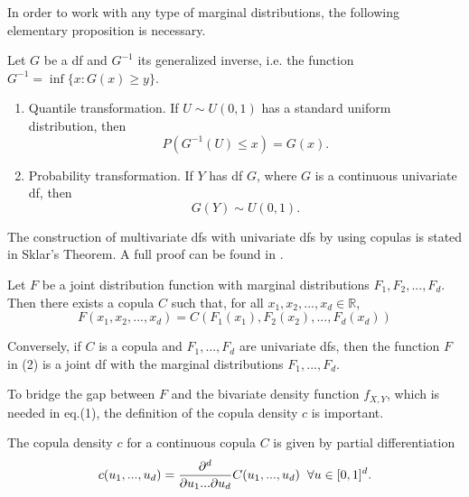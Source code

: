 \documentclass[a4paper]{article}
\begin{document}
In order to work with any type of marginal distributions, the following elementary proposition is necessary.

\begin{proposition}
	Let $G$ be a df and $G^{-1}$ its generalized inverse, i.e. the function $G^{-1}=\inf\{x:G(x) \geq y\}$.
	\begin{enumerate}
		\item {Quantile transformation}. If $U \sim U(0,1)$ has a standard uniform distribution, then 
		\begin{displaymath}
		P(G^{-1}(U) \leq x) = G(x).
		\end{displaymath}
		\item {Probability transformation}. If $Y$ has df $G$, where $G$ is a continuous univariate df, then 
		\begin{displaymath}
		G(Y) \sim U(0,1).
	   \end{displaymath}
	\end{enumerate}
	
\end{proposition}

The construction of multivariate dfs with univariate dfs by using copulas is stated in Sklar's Theorem. A full proof can be found in \cite{SS83}.

\begin{proposition}
	Let $F$ be a joint distribution function with marginal distributions $F_1, F_2, ..., F_d$. Then there exists a copula $C$ such that, for all $x_1, x_2, ..., x_d \in \mathbb{R}$, 
	\begin{equation}
		F(x_1,x_2,...,x_d)=C(F_1(x_1),F_2(x_2),...,F_d(x_d))
	\end{equation}
\end{proposition}

Conversely, if $C$ is a copula and $F_1, ..., F_d$ are univariate dfs, then the function $F$ in (2) is a joint df with the marginal distributions $F_1,...,F_d$.

\vspace{0.2cm}
To bridge the gap between $F$ and the bivariate density function $f_{X,Y}$, which is needed in eq.(1), the definition of the copula density $c$ is important.


\begin{definition}
	The copula density $c$ for a continuous copula $C$ is given by partial differentiation
	\begin{equation}
		c(u_1,...,u_d)=\frac{\partial^d}{\partial u_1 ... \partial u_d} C(u_1,...,u_d) \hspace{0.2cm} \forall u \in [0,1]^d.
	\end{equation}
\end{definition}
\end{document}
